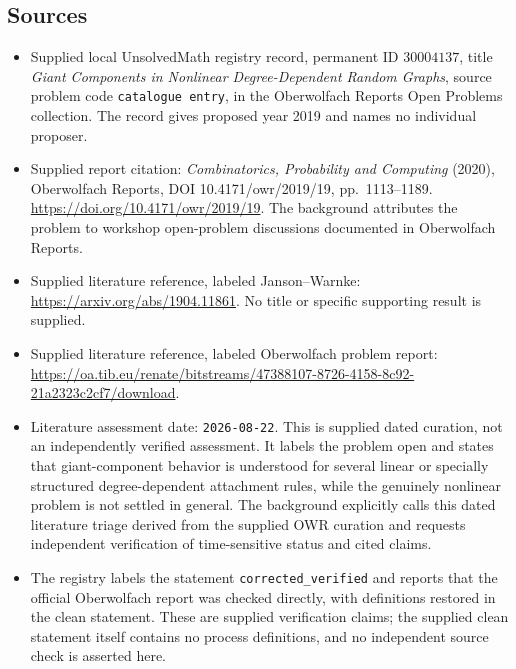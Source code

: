 \documentclass[11pt]{article}
\begin{document}
\subsection{Sources}
\begin{itemize}
\item Supplied local UnsolvedMath registry record, permanent ID \(30004137\), title \emph{Giant Components in Nonlinear Degree-Dependent Random Graphs}, source problem code \texttt{catalogue entry}, in the Oberwolfach Reports Open Problems collection. The record gives proposed year 2019 and names no individual proposer.
\item Supplied report citation: \emph{Combinatorics, Probability and Computing} (2020), Oberwolfach Reports, DOI 10.4171/owr/2019/19, pp.\ 1113--1189. \url{https://doi.org/10.4171/owr/2019/19}. The background attributes the problem to workshop open-problem discussions documented in Oberwolfach Reports.
\item Supplied literature reference, labeled Janson--Warnke: \url{https://arxiv.org/abs/1904.11861}. No title or specific supporting result is supplied.
\item Supplied literature reference, labeled Oberwolfach problem report: \url{https://oa.tib.eu/renate/bitstreams/47388107-8726-4158-8c92-21a2323c2cf7/download}.
\item Literature assessment date: \texttt{2026-08-22}. This is supplied dated curation, not an independently verified assessment. It labels the problem open and states that giant-component behavior is understood for several linear or specially structured degree-dependent attachment rules, while the genuinely nonlinear problem is not settled in general. The background explicitly calls this dated literature triage derived from the supplied OWR curation and requests independent verification of time-sensitive status and cited claims.
\item The registry labels the statement \texttt{corrected\_verified} and reports that the official Oberwolfach report was checked directly, with definitions restored in the clean statement. These are supplied verification claims; the supplied clean statement itself contains no process definitions, and no independent source check is asserted here.
\end{itemize}
\end{document}
